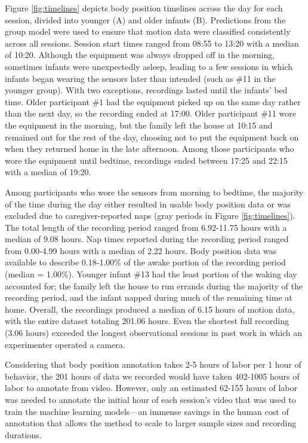 \documentclass[
  man]{apa6}
\begin{document}
Figure \ref{fig:timelines} depicts body position timelines across the day for each session, divided into younger (A) and older infants (B). Predictions from the group model were used to ensure that motion data were classified consistently across all sessions. Session start times ranged from 08:55 to 13:20 with a median of 10:20. Although the equipment was always dropped off in the morning, sometimes infants were unexpectedly asleep, leading to a few sessions in which infants began wearing the sensors later than intended (such as \#11 in the younger group). With two exceptions, recordings lasted until the infants' bed time. Older participant \#1 had the equipment picked up on the same day rather than the next day, so the recording ended at 17:00. Older participant \#11 wore the equipment in the morning, but the family left the house at 10:15 and remained out for the rest of the day, choosing not to put the equipment back on when they returned home in the late afternoon. Among those participants who wore the equipment until bedtime, recordings ended between 17:25 and 22:15 with a median of 19:20.

Among participants who wore the sensors from morning to bedtime, the majority of the time during the day either resulted in usable body position data or was excluded due to caregiver-reported naps (gray periods in Figure \ref{fig:timelines}). The total length of the recording period ranged from 6.92-11.75 hours with a median of 9.08 hours. Nap times reported during the recording period ranged from 0.00-4.99 hours with a median of 2.22 hours. Body position data was available to describe 0.18-1.00\% of the awake portion of the recording period (median = 1.00\%). Younger infant \#13 had the least portion of the waking day accounted for; the family left the house to run errands during the majority of the recording period, and the infant napped during much of the remaining time at home. Overall, the recordings produced a median of 6.15 hours of motion data, with the entire dataset totaling 201.06 hours. Even the shortest full recording (3.06 hours) exceeded the longest observational sessions in past work in which an experimenter operated a camera.

Considering that body position annotation takes 2-5 hours of labor per 1 hour of behavior, the 201 hours of data we recorded would have taken 402-1005 hours of labor to annotate from video. However, only an estimated 62-155 hours of labor was needed to annotate the initial hour of each session's video that was used to train the machine learning models---an immense savings in the human cost of annotation that allows the method to scale to larger sample sizes and recording durations.
\end{document}
